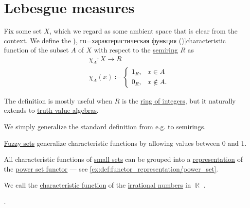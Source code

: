 \section{Lebesgue measures}\label{sec:lebesgue_measures}

\begin{definition}\label{def:subset_characteristic_function}
  Fix some set \( X \), which we regard as some ambient space that is clear from the context. We define the \term[bg=характеристична функция (\cite[exerc. 4.1]{Драганов2022ТеорияНаМярката}), ru=характеристическая функция (\cite[131]{Богачёв2003ОсновыТеорииМерыТом1})]{characteristic function} of the subset \( A \) of \( X \) with respect to the \hyperref[def:semiring]{semiring} \( R \) as
  \begin{equation}\label{eq:def:dirichlet_function}
    \begin{aligned}
      &\chi_A: X \to R \\
      &\chi_A(x) \coloneqq \begin{cases}
        1_R, &x \in A \\
        0_R, &x \notin A.
      \end{cases}
    \end{aligned}
  \end{equation}

  The definition is mostly useful when \( R \) is the \hyperref[def:integers]{ring of integers}, but it naturally extends to \hyperref[def:truth_value_algebra]{truth value algebras}.
\end{definition}
\begin{comments}
  \item We simply generalize the standard definition from e.g. \cite[15]{Halmos1976MeasureTheory} to semirings.

  \item \hyperref[def:fuzzy_set]{Fuzzy sets} generalize characteristic functions by allowing values between \( 0 \) and \( 1 \).

  \item All characteristic functions of \hyperref[def:small_set]{small sets} can be grouped into a \hyperref[def:functor_representation]{representation} of the \hyperref[ex:def:functor/power_set]{power set functor} --- see \cref{ex:def:functor_representation/power_set}.
\end{comments}

\begin{definition}\label{def:dirichlet_function}
  We call the \hyperref[def:subset_characteristic_function]{characteristic function} of the \hyperref[def:irrational_number]{irrational numbers} in \( \BbbR \) .
\end{definition}

\begin{definition}\label{def:lebesgue_measure}
  .
\end{definition}
